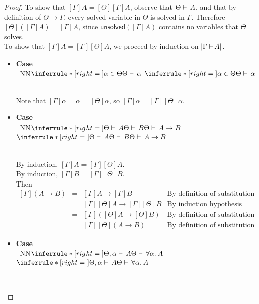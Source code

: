 \documentclass[a4paper]{article}
\newcommand{\arr}{\rightarrow}
\def\CompactJudgments{0}
\newcommand{\entails}{\mathrel{\ifnum\CompactJudgments=1\vdash \else \vdash\,\fi}}
\gdef\xxDerivationProofCaseColor{N}
\newcommand{\DerivationProofCase}[3]{\smallskip
     \item \parbox[t]{100ex}{\textbf{Case } \\[-0.5em]
       $~$\hspace{5ex}
       \if\xxDerivationProofCaseColor N\ensuremath{\Infer{#1}{#2}{#3}}
       \else \colorbox{\xxDerivationProofCaseColor}{\ensuremath{\Infer{#1}{#2}{#3}}}\fi }\nopagebreak \\[-0.8ex]
  }
\newcommand{\xunsolved}{\mathsf{unsolved}}
\newcommand{\unsolved}[1]{\xunsolved(#1)}
\newcommand{\AllSym}{\forall}
\newcommand{\xAll}[1]{\AllSym#1}
\newcommand{\All}[1]{\xAll{#1}.\:}
\newcommand{\Infer}[3]{\inferrule*[right={\text{\strut#1}}]{{}#2\mathstrut}{{}#3\mathstrut}}
\newcommand{\alltype}[1]{\All{#1}}
\newcommand{\extendssym}{\longrightarrow}
\newcommand{\extends}[2]{{#1} \extendssym {#2}}
\newcommand{\substextend}[2]{\extends{#1}{#2}}
\newcommand{\judgetp}[2]{{#1} \entails {#2}}
\newcommand{\typesize}[2]{|{#1} {\;\entails} {#2}|}
\begin{document}
\substitutionextensioninvariance*
\begin{proof}
  To show that $[\Gamma]A = [\Theta][\Gamma]A$, observe that $\judgetp{\Theta}{A}$,
  and that by definition of $\substextend{\Theta}{\Gamma}$,
  every solved variable in $\Theta$ is solved in $\Gamma$.
  Therefore $[\Theta]([\Gamma]A) = [\Gamma]A$,
  since $\unsolved{[\Gamma]A}$ contains no variables that $\Theta$ solves. \\

  To show that $[\Gamma]A = [\Gamma][\Theta]A$, we proceed by induction on $\typesize{\Gamma}{A}$. 
  
  \begin{itemize}
      \DerivationProofCase{}
                          {\alpha \in \Theta}
                          {\judgetp{\Theta}{\alpha}}

          Note that $[\Gamma]\alpha = \alpha = [\Theta]\alpha$, so $[\Gamma]\alpha = [\Gamma][\Theta]\alpha$. 

      \DerivationProofCase{}
                          {\judgetp{\Theta}{A} \\ \judgetp{\Theta}{B}}
                          {\judgetp{\Theta}{A \arr B}}

          By induction, $[\Gamma]A = [\Gamma][\Theta]A$. \\
          By induction, $[\Gamma]B = [\Gamma][\Theta]B$. \\
          Then
          \begin{displaymath}
          \begin{array}{lcll}
            [\Gamma](A \arr B) & = & [\Gamma]A \arr [\Gamma]B & \mbox{By definition of substitution} \\
                              & = & [\Gamma][\Theta]A \arr [\Gamma][\Theta]B & \mbox{By induction hypothesis (twice)} \\
                              & = & [\Gamma]([\Theta]A \arr [\Theta]B) & \mbox{By definition of substitution} \\
                              & = & [\Gamma][\Theta](A \arr B) & \mbox{By definition of substitution}
          \end{array}
          \end{displaymath}                  

      \DerivationProofCase{}
                          {\judgetp{\Theta, \alpha}{A}}
                          {\judgetp{\Theta}{\alltype{\alpha}{A}}}


\end{itemize}
\end{proof}
\end{document}
